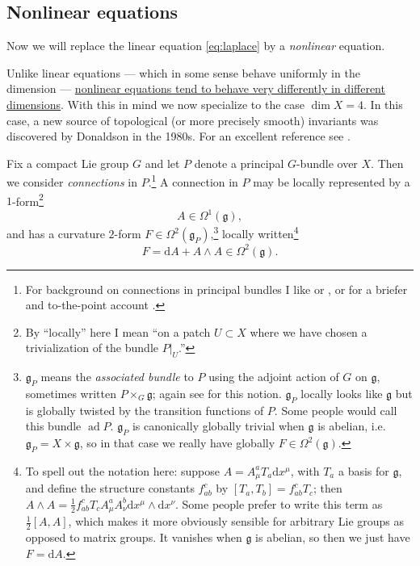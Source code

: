 \documentclass[12pt,letterpaper,reqno]{article}
\numberwithin{equation}{section}
\newcommand{\fg}{{\mathfrak g}}
\newcommand{\half}{\ensuremath{\frac{1}{2}}}
\newcommand{\de}{\mathrm{d}}
\newcommand{\ti}[1]{\textit{#1}}
\DeclareMathOperator{\ad}{ad}
\begin{document}
\subsection{Nonlinear equations}

Now we will replace the linear equation
\eqref{eq:laplace} by a \ti{nonlinear} equation.

Unlike linear equations --- which in some sense behave uniformly
in the dimension --- \ul{nonlinear equations tend to behave very
differently in different dimensions}. With this in mind
we now specialize to the case $\dim X = 4$.
In this case, a new source of topological
(or more precisely smooth) invariants was discovered
by Donaldson in the 1980s. For an excellent reference see \cite{MR1079726}.

Fix a compact Lie group $G$ and let $P$ denote a principal $G$-bundle over $X$. Then
we consider \ti{connections} in $P$.\footnote{For background on connections in principal
bundles I like \cite{spivak} or \cite{Kobayashi1996a}, or for a briefer and to-the-point 
account \cite{Freed1992}.}
A connection in $P$ may be locally represented by a $1$-form\footnote{By ``locally'' here I mean ``on a patch $U \subset X$ where we
have chosen a trivialization of the bundle $P \vert_U$.''}
\begin{equation}
  A \in \Omega^1(\fg),
\end{equation}
and has a curvature $2$-form $F \in \Omega^2(\fg_P)$,\footnote{$\fg_P$ means the \ti{associated bundle} to $P$ using the
adjoint action of $G$ on $\fg$, sometimes written $P \times_G \fg$; 
again see \cite{spivak} for this notion. 
$\fg_P$ locally looks like $\fg$ but is globally twisted
by the transition functions of $P$. Some people would call this bundle $\ad P$. 
$\fg_P$ is canonically globally trivial when $\fg$ is abelian, i.e. $\fg_P = X \times \fg$,
so in that case we really have globally $F \in \Omega^2(\fg)$.} 
locally written\footnote{To spell out the 
notation here: suppose $A = A_\mu^a T_a \de x^\mu$, with $T_a$ a basis for $\fg$, and define the structure constants
$f_{ab}^c$ by $[T_a, T_b] = f_{ab}^c T_c$; then $A \wedge A = \half f_{ab}^c T_c A_\mu^a A_\nu^b \de x^\mu \wedge \de x^\nu$.
Some people prefer to write this term as $\half [A,A]$, which makes it more obviously sensible
for arbitrary Lie groups as opposed to matrix groups. It vanishes when $\fg$ is abelian, so then we just have
$F = \de A$.}
\begin{equation} \label{eq:curvature}
  F = \de A + A \wedge A \in \Omega^2(\fg).
\end{equation}
\end{document}
